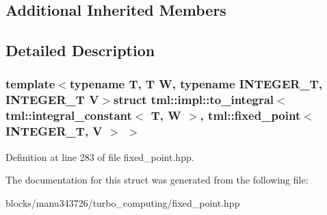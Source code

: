\subsection*{Additional Inherited Members}


\subsection{Detailed Description}
\subsubsection*{template$<$typename T, T W, typename I\+N\+T\+E\+G\+E\+R\+\_\+\+T, I\+N\+T\+E\+G\+E\+R\+\_\+\+T V$>$struct tml\+::impl\+::to\+\_\+integral$<$ tml\+::integral\+\_\+constant$<$ T, W $>$, tml\+::fixed\+\_\+point$<$ I\+N\+T\+E\+G\+E\+R\+\_\+\+T, V $>$ $>$}



Definition at line 283 of file fixed\+\_\+point.\+hpp.



The documentation for this struct was generated from the following file\+:\begin{DoxyCompactItemize}
\item 
blocks/manu343726/turbo\+\_\+computing/fixed\+\_\+point.\+hpp\end{DoxyCompactItemize}
